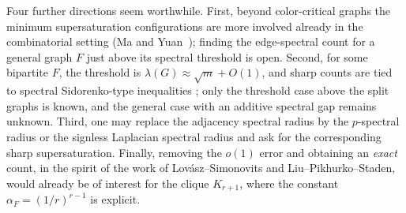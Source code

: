 \documentclass[11pt,a4paper]{article}
\theoremstyle{definition}
\theoremstyle{plain}
\begin{document}
Four further directions seem worthwhile. First, beyond color-critical graphs the minimum
supersaturation configurations are more involved already in the combinatorial setting
(Ma and Yuan~\cite{MY2025}); finding the edge-spectral count for a general graph $F$
just above its spectral threshold is open. Second, for some bipartite $F$, the threshold is
$\lambda(G)\approx\sqrt m + O(1)$, and sharp counts are tied to spectral Sidorenko-type
inequalities \cite{LLLZ2026}; 
only the threshold case above the split graphs is known, and the general case with an additive spectral gap remains unknown. Third, one may replace the adjacency spectral radius by the
$p$-spectral radius \cite{KN2014,KNY2015} or 
 the signless Laplacian spectral radius \cite{ZLL2026LAA, ZLF2026} and ask for the
corresponding sharp supersaturation. 
Finally, removing the $o(1)$ error and obtaining an \emph{exact} count, in the spirit
of the work of Lov\'asz--Simonovits and Liu--Pikhurko--Staden, would already be of interest for the clique $K_{r+1}$,
where the constant $\alpha_F=(1/r)^{r-1}$ is explicit.
\end{document}
